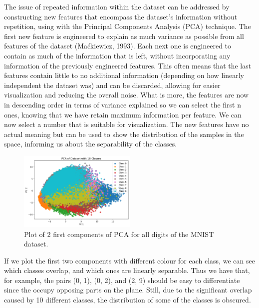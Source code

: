 \documentclass{article}
\begin{document}
The issue of repeated information within the dataset can be addressed by constructing new features that encompass the dataset’s information without repetition, using with the Principal Components Analysis (PCA) technique.
The first new feature is engineered to explain as much variance as possible from all features of the dataset (Maćkiewicz, 1993).
Each next one is engineered to contain as much of the information that is left, without incorporating any information of the previously engineered features.
This often means that the last features contain little to no additional information (depending on how linearly independent the dataset was) and can be discarded, allowing for easier visualization and reducing the overall noise.
What is more, the features are now in descending order in terms of variance explained so we can select the first n ones, knowing that we have retain maximum information per feature.
We can now select a number that is suitable for visualization.
The new features have no actual meaning but can be used to show the distribution of the samples in the space, informing us about the separability of the classes.

\begin{figure}[h!]
    \centering
    \includegraphics[width=0.5\textwidth]{./plots/plot1.png}  %
    \caption{Plot of 2 first components of PCA for all digits of the MNIST dataset.}
    \label{fig:plot1}  %
\end{figure}

If we plot the first two components with different colour for each class, we can see which classes overlap, and which ones are linearly separable.
Thus we have that, for example, the pairs (0, 1), (0, 2), and (2, 9) should be easy to differentiate since the occupy opposing parts on the plane.
Still, due to the significant overlap caused by 10 different classes, the distribution of some of the classes is obscured. 
\end{document}
